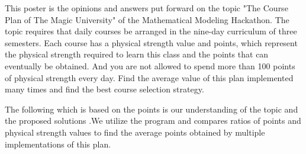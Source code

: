 \hspace*{2cm} This poster is the opinions and answers put forward on the topic "The Course Plan of The Magic University" of the Mathematical Modeling Hackathon. The topic requires that daily courses be arranged in the nine-day curriculum of three semesters. Each course has a physical strength value and points, which represent the physical strength required to learn this class and the points that can eventually be obtained. And you are not allowed to spend more than 100 points of physical strength every day. Find the average value of this plan implemented many times and find the best course selection strategy. 

\hspace*{2cm} The following which is based on the points is our understanding of the topic and the proposed solutions .We utilize the program and compares ratios of points and physical strength values to find the average points obtained by multiple implementations of this plan.  